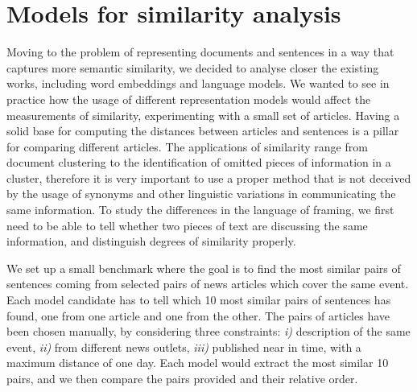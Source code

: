 \section{Models for similarity analysis}
\label{sec:cgs_similarity}
Moving to the problem of representing documents and sentences in a way that captures more semantic similarity, we decided to analyse closer the existing works, including word embeddings and language models.
We wanted to see in practice how the usage of different representation models would affect the measurements of similarity, experimenting with a small set of articles. 
Having a solid base for computing the distances between articles and sentences is a pillar for comparing different articles. The applications of similarity range from document clustering to the identification of omitted pieces of information in a cluster, therefore it is very important to use a proper method that is not deceived by the usage of synonyms and other linguistic variations in communicating the same information. To study the differences in the language of framing, we first need to be able to tell whether two pieces of text are discussing the same information, and distinguish degrees of similarity properly.

We set up a small benchmark where the goal is to find the most similar pairs of sentences coming from selected pairs of news articles which cover the same event. Each model candidate has to tell which 10 most similar pairs of sentences has found, one from one article and one from the other.
The pairs of articles have been chosen manually, by considering three constraints: \textit{i)} description of the same event, \textit{ii)} from different news outlets, \textit{iii)} published near in time, with a maximum distance of one day.
Each model would extract the most similar 10 pairs, and we then compare the pairs provided and their relative order.

